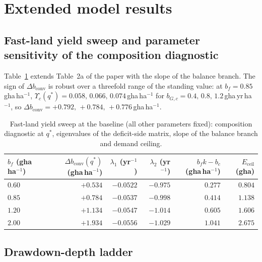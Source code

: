 \documentclass[11pt,a4paper]{article}
\newcommand{\dconv}{\Delta b_{\mathrm{conv}}}
\newcommand{\Ups}{\Upsilon_c}
\newcommand{\Eceil}{E_{\mathrm{ceil}}}
\begin{document}
\section{Extended model results}\label{si:results}

\subsection{Fast-land yield sweep and parameter sensitivity of the composition diagnostic}\label{si:sweep}

Table~\ref{tab:si_sweep} extends Table~2a of the paper with the slope of the balance branch. The sign of $\dconv$ is robust over a threefold range of the standing value: at $b_f=0.85$\,gha\,ha$^{-1}$, $\Ups(q^*)=0.058,\,0.066,\,0.074$\,gha\,ha$^{-1}$ for $b_{G,c}=0.4,\,0.8,\,1.2$\,gha\,yr\,ha$^{-1}$, so $\dconv=+0.792,\,+0.784,\,+0.776$\,gha\,ha$^{-1}$.

\begin{table}[htbp]
\centering\small
\caption{Fast-land yield sweep at the baseline (all other parameters fixed): composition diagnostic at $q^*$, eigenvalues of the deficit-side matrix, slope of the balance branch and demand ceiling.}
\label{tab:si_sweep}
\begin{tabular}{l r r r r r}
\toprule
$b_f$ (gha\,ha$^{-1}$) & $\dconv(q^*)$ (gha\,ha$^{-1}$) & $\lambda_1$ (yr$^{-1}$) & $\lambda_2$ (yr$^{-1}$) & $b_fk-b_c$ (gha\,ha$^{-1}$) & $\Eceil$ (gha) \\
\midrule
$0.60$ & $+0.534$ & $-0.0522$ & $-0.975$ & $0.277$ & $0.804$ \\
$0.85$ & $+0.784$ & $-0.0537$ & $-0.998$ & $0.414$ & $1.138$ \\
$1.20$ & $+1.134$ & $-0.0547$ & $-1.014$ & $0.605$ & $1.606$ \\
$2.00$ & $+1.934$ & $-0.0556$ & $-1.029$ & $1.041$ & $2.675$ \\
\bottomrule
\end{tabular}
\end{table}

\subsection{Drawdown-depth ladder}\label{si:ladder}
\end{document}

